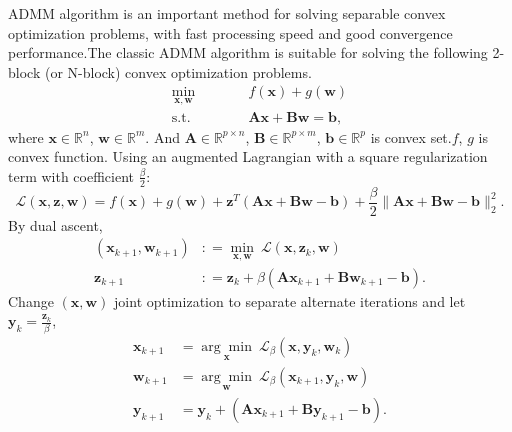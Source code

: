 \documentclass[fontset=windows]{article}
\begin{document}
{ADMM algorithm is an important method for solving separable convex optimization problems, with fast processing speed and good convergence performance.The classic ADMM algorithm is suitable for solving the following 2-block (or N-block) convex optimization problems.
\begin{equation}
    \begin{aligned}
        \underset{\mathbf x,\mathbf w}{\min}\qquad&\quad f(\mathbf x) + g(\mathbf w)\\
        \text{s.t.}\qquad&\quad  \mathbf A\mathbf x+\mathbf B\mathbf w = \mathbf b,
    \end{aligned}
    \label{admmlg}
\end{equation}
where $\mathbf x \in \mathbb{R}^n$, $\mathbf w \in \mathbb{R}^m$. And $\mathbf A \in \mathbb{R}^{p \times n}$, $\mathbf B \in \mathbb{R}^{p \times m}$, $\mathbf b \in \mathbb{R}^p$ is convex set.$f$, $g$ is convex function.
Using an augmented Lagrangian with a square regularization term with coefficient $\frac{\beta}{2}$:
\begin{equation}
    \mathcal{L}(\mathbf x,\mathbf z,\mathbf w) = f(\mathbf x) +g(\mathbf w) + \mathbf z^T(\mathbf A\mathbf x+\mathbf B\mathbf w-\mathbf b) + \frac{\beta}{2} \lVert \mathbf A\mathbf x+\mathbf B\mathbf w-\mathbf b \rVert_2^2.
\end{equation}
By dual ascent,
\begin{equation}
    \begin{aligned}
        (\mathbf x_{k+1},\mathbf w_{k+1}) & \colon = \underset{\mathbf x,\mathbf w}{\min}\ \mathcal{L}(\mathbf x,\mathbf z_k,\mathbf w)\\
        \mathbf z_{k+1} & \colon = \mathbf z_k + \beta (\mathbf A \mathbf x_{k+1} + \mathbf B \mathbf w_{k+1} - \mathbf b).
    \end{aligned}
\end{equation}
Change $(\mathbf x,\mathbf w)$ joint optimization to separate alternate iterations and let $\mathbf y_k = \frac{\mathbf z_k}{\beta}$,
\begin{equation}
    \begin{aligned}
        \mathbf x_{k+1} &  = \underset{\mathbf x}{\arg\min}\  \mathcal{L}_{\beta}(\mathbf x,\mathbf y_k,\mathbf w_{k})\\
        \mathbf w_{k+1} &  = \underset{\mathbf w}{\arg\min}\  \mathcal{L}_{\beta}(\mathbf x_{k+1},\mathbf y_k,\mathbf w)\\
        \mathbf y_{k+1} &  = \mathbf y_k + (\mathbf A \mathbf x_{k+1} + \mathbf B \mathbf y_{k+1} - \mathbf b).
    \end{aligned}
\end{equation}

}
\end{document}
